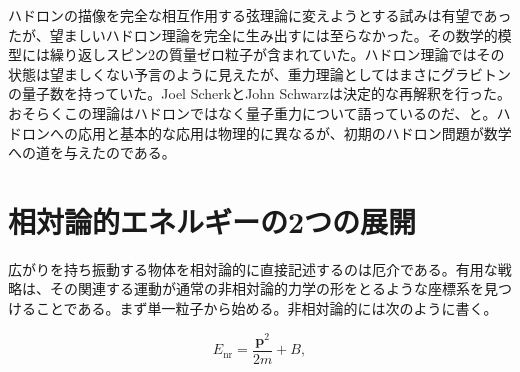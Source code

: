 ハドロンの描像を完全な相互作用する弦理論に変えようとする試みは有望であったが、望ましいハドロン理論を完全に生み出すには至らなかった。その数学的模型には繰り返しスピン2の質量ゼロ粒子が含まれていた。ハドロン理論ではその状態は望ましくない予言のように見えたが、重力理論としてはまさにグラビトンの量子数を持っていた。Joel ScherkとJohn Schwarzは決定的な再解釈を行った。おそらくこの理論はハドロンではなく量子重力について語っているのだ、と。ハドロンへの応用と基本的な応用は物理的に異なるが、初期のハドロン問題が数学への道を与えたのである。

\begin{classroomqa}
\end{classroomqa}

\begin{classroomqa}
\end{classroomqa}

\begin{classroomqa}
\end{classroomqa}

\section{相対論的エネルギーの2つの展開}

広がりを持ち振動する物体を相対論的に直接記述するのは厄介である。有用な戦略は、その関連する運動が通常の非相対論的力学の形をとるような座標系を見つけることである。まず単一粒子から始める。非相対論的には次のように書く。

\begin{equation}
  E_{\mathrm{nr}}=\frac{\bm p^2}{2m}+B,
  \label{eq:l01-nonrel-energy}
\end{equation}

